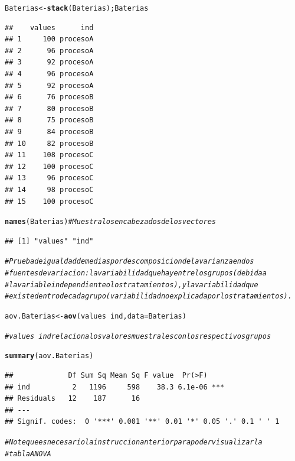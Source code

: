 \documentclass[12pt,letterpaper]{article}\usepackage[]{graphicx}\usepackage[]{color}
\makeatletter
\newcommand{\hlcom}[1]{\textcolor[rgb]{0.678,0.584,0.686}{\textit{#1}}}%
\newcommand{\hlopt}[1]{\textcolor[rgb]{0,0,0}{#1}}%
\newcommand{\hlstd}[1]{\textcolor[rgb]{0.345,0.345,0.345}{#1}}%
\newcommand{\hlkwb}[1]{\textcolor[rgb]{0.69,0.353,0.396}{#1}}%
\newcommand{\hlkwc}[1]{\textcolor[rgb]{0.333,0.667,0.333}{#1}}%
\newcommand{\hlkwd}[1]{\textcolor[rgb]{0.737,0.353,0.396}{\textbf{#1}}}%
\newenvironment{kframe}{%
 \def\at@end@of@kframe{}%
 \ifinner\ifhmode%
  \def\at@end@of@kframe{\end{minipage}}%
  \begin{minipage}{\columnwidth}%
 \fi\fi%
 \def\FrameCommand##1{\hskip\@totalleftmargin \hskip-\fboxsep
 \colorbox{shadecolor}{##1}\hskip-\fboxsep
     \hskip-\linewidth \hskip-\@totalleftmargin \hskip\columnwidth}%
 \MakeFramed {\advance\hsize-\width
   \@totalleftmargin\z@ \linewidth\hsize
   \@setminipage}}%
 {\par\unskip\endMakeFramed%
 \at@end@of@kframe}
\newenvironment{knitrout}{}{} %
\makeatother
\begin{document}
\begin{enumerate}
\begin{knitrout}
\color{fgcolor}\begin{kframe}
\begin{alltt}
\hlstd{Baterias} \hlkwb{<-} \hlkwd{stack}\hlstd{(Baterias); Baterias}
\end{alltt}
\begin{verbatim}
##    values      ind
## 1     100 procesoA
## 2      96 procesoA
## 3      92 procesoA
## 4      96 procesoA
## 5      92 procesoA
## 6      76 procesoB
## 7      80 procesoB
## 8      75 procesoB
## 9      84 procesoB
## 10     82 procesoB
## 11    108 procesoC
## 12    100 procesoC
## 13     96 procesoC
## 14     98 procesoC
## 15    100 procesoC
\end{verbatim}
\begin{alltt}
\hlkwd{names}\hlstd{(Baterias)} \hlcom{# Muestra los encabezados de los vectores}
\end{alltt}
\begin{verbatim}
## [1] "values" "ind"
\end{verbatim}
\end{kframe}
\end{knitrout}

\begin{knitrout}
\color{fgcolor}\begin{kframe}
\begin{alltt}
\hlcom{# Prueba de igualdad de medias por descomposicion de la varianza en dos }
\hlcom{# fuentes de variacion: la variabilidad que hay entre los grupos (debida a }
\hlcom{# la variable independiente o los tratamientos), y la variabilidad que }
\hlcom{# existe dentro de cada grupo (variabilidad no explicada por los tratamientos). }
\end{alltt}
\end{kframe}
\end{knitrout}

\begin{knitrout}
\color{fgcolor}\begin{kframe}
\begin{alltt}
\hlstd{aov.Baterias} \hlkwb{<-} \hlkwd{aov}\hlstd{(values}\hlopt{~}\hlstd{ind,} \hlkwc{data}\hlstd{=Baterias)}

\hlcom{# values~ind relaciona los valores muestrales con los respectivos grupos}

\hlkwd{summary}\hlstd{(aov.Baterias)}
\end{alltt}
\begin{verbatim}
##             Df Sum Sq Mean Sq F value  Pr(>F)    
## ind          2   1196     598    38.3 6.1e-06 ***
## Residuals   12    187      16                    
## ---
## Signif. codes:  0 '***' 0.001 '**' 0.01 '*' 0.05 '.' 0.1 ' ' 1
\end{verbatim}
\begin{alltt}
\hlcom{# Note que es necesario la instruccion anterior para poder visualizar la }
\hlcom{# tabla ANOVA }
\end{alltt}
\end{kframe}
\end{knitrout}


\end{enumerate}
\end{document}
